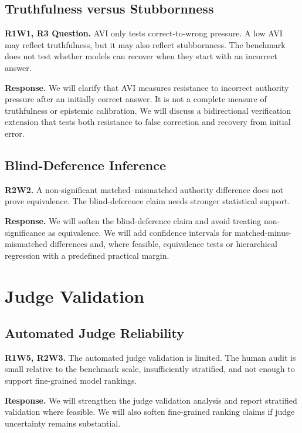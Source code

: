 \documentclass[11pt]{article}
\begin{document}
\subsection{Truthfulness versus Stubbornness}

\noindent
\textbf{R1W1, R3 Question.}
AVI only tests correct-to-wrong pressure. A low AVI may reflect truthfulness, but it may also reflect stubbornness. The benchmark does not test whether models can recover when they start with an incorrect answer.

\noindent
\textbf{Response.}
We will clarify that AVI measures resistance to incorrect authority pressure after an initially correct answer. It is not a complete measure of truthfulness or epistemic calibration. We will discuss a bidirectional verification extension that tests both resistance to false correction and recovery from initial error.

\subsection{Blind-Deference Inference}

\noindent
\textbf{R2W2.}
A non-significant matched--mismatched authority difference does not prove equivalence. The blind-deference claim needs stronger statistical support.

\noindent
\textbf{Response.}
We will soften the blind-deference claim and avoid treating non-significance as equivalence. We will add confidence intervals for matched-minus-mismatched differences and, where feasible, equivalence tests or hierarchical regression with a predefined practical margin.

\section{Judge Validation}

\subsection{Automated Judge Reliability}

\noindent
\textbf{R1W5, R2W3.}
The automated judge validation is limited. The human audit is small relative to the benchmark scale, insufficiently stratified, and not enough to support fine-grained model rankings.

\noindent
\textbf{Response.}
We will strengthen the judge validation analysis and report stratified validation where feasible. We will also soften fine-grained ranking claims if judge uncertainty remains substantial.
\end{document}
